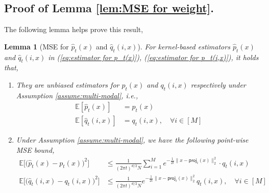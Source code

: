 \documentclass{article}
\newcommand{\proj}{\mathsf{proj}}
\theoremstyle{plain}
\newtheorem{lemma}{\bf Lemma}
\theoremstyle{remark}
\begin{document}
\subsection{Proof of Lemma \ref{lem:MSE for weight}.}
\label{pf-of-lem:lem:MSE for weight}
The following lemma helps prove this result, 
\begin{lemma}[MSE for $\widehat{p}_t(x)$ and $\widehat{q}_t(i,x)$]
    \label{lem:MSE for p_t and p_t(i)}
    For kernel-based estimators $\widehat{p}_t(x)$ and $\widehat{q}_t(i,x)$ in (\ref{eq:estimator for p_t(x)}), (\ref{eq:estimator for p_t(i,x)}), it holds that, 
    \begin{enumerate}
        \item They are unbiased estimators for $p_t(x)$ and $q_t(i,x)$ respectively under Assumption \ref{assume:multi-modal}, i.e., 
        \begin{subequations}
            \begin{align*}
                \mathbb{E}[\widehat{p}_t(x)] &= p_t(x) \\
                \mathbb{E}[\widehat{q}_t(i,x)] &= q_t(i,x), \quad \forall i \in [M]
            \end{align*}
        \end{subequations}

        \item Under Assumption \ref{assume:multi-modal}, we have the following point-wise MSE bound, 
        \begin{subequations}
            \begin{align}
                \mathbb{E}\big[\big(\widehat{p}_t(x)-p_t(x)\big)^2\big]&\leq \frac{1}{(2\pi t)^{d/2} N} \sum_{i=1}^M  e^{-\frac{1}{2t} \| x-\proj_i(x)\|_2^2} \cdot q_t(i,x)\label{eq:MSE for p_t} \\
                \mathbb{E}\big[\big(\widehat{q}_t(i,x)-q_t(i,x)\big)^2\big] &\leq \frac{1}{(2\pi t)^{d/2} N} e^{-\frac{1}{2t} \| x-\proj_i(x)\|_2^2} q_t(i,x), \quad \forall i \in [M]\label{eq:MSE for p_t(i)}
            \end{align}
        \end{subequations}
    \end{enumerate}
\end{lemma}
\end{document}
